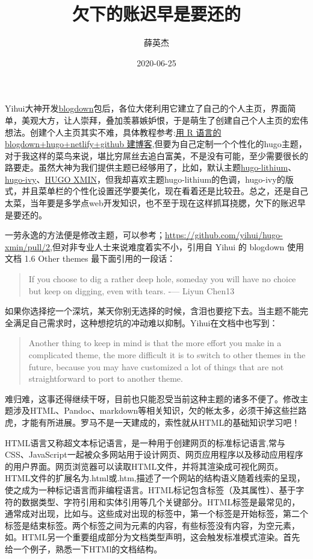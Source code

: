 \documentclass[
]{article}
\title{欠下的账迟早是要还的}
\author{薛英杰}
\date{2020-06-25}
\begin{document}
\maketitle

Yihui大神开发\href{https://bookdown.org/yihui/blogdown/}{blogdown}包后，各位大佬利用它建立了自己的个人主页，界面简单，美观大方，让人崇拜，叠加羡慕嫉妒恨，于是萌生了创建自己个人主页的宏伟想法。创建个人主页其实不难，具体教程参考:\href{https://cosx.org/2018/01/build-blog-with-blogdown-hugo-netlify-github/}{用
R 语言的 blogdown+hugo+netlify+github
建博客},但要为自己定制一个个性化的hugo主题，对于我这样的菜鸟来说，堪比穷屌丝去追白富美，不是没有可能，至少需要很长的路要走。虽然大神为我们提供主题已经够用了，比如，默认主题\href{https://github.com/yihui/hugo-lithium}{hugo-lithium}、\href{https://github.com/yihui/hugo-ivy}{hugo-ivy}、\href{https://deploy-preview-16--hugo-xmin.netlify.app}{HUGO
XMIN}，但我却喜欢主题hugo-lithium的色调，hugo-ivy的版式，并且菜单栏的个性化设置还学要美化，现在看着还是比较丑。总之，还是自己太菜，当年要是多学点web开发知识，也不至于现在这样抓耳挠腮，欠下的账迟早是要还的。

一劳永逸的方法便是修改主题，可以参考；\url{https://github.com/yihui/hugo-xmin/pull/2},但对非专业人士来说难度着实不小，引用自
Yihui 的 blogdown 使用文档 1.6 Other themes 最下面引用的一段话：

\begin{quote}
If you choose to dig a rather deep hole, someday you will have no choice
but keep on digging, even with tears. -\/--- Liyun Chen13
\end{quote}

如果你选择挖一个深坑，某天你别无选择的时候，含泪也要挖下去。当主题不能完全满足自己需求时，这种想挖坑的冲动难以抑制。Yihui在文档中也写到：

\begin{quote}
Another thing to keep in mind is that the more effort you make in a
complicated theme, the more difficult it is to switch to other themes in
the future, because you may have customized a lot of things that are not
straightforward to port to another theme.
\end{quote}

难归难，这事还得继续干呀，目前也只能忍受当前这种主题的诸多不便了。修改主题涉及HTML、Pandoc、markdown等相关知识，欠的帐太多，必须干掉这些拦路虎，才能有所进展。罗马不是一天建成的，索性就从HTML的基础知识学习吧！

HTML语言又称超文本标记语言，是一种用于创建网页的标准标记语言,常与CSS、JavaScript一起被众多网站用于设计网页、网页应用程序以及移动应用程序的用户界面。网页浏览器可以读取HTML文件，并将其渲染成可视化网页。HTML文件的扩展名为.html或.htm,描述了一个网站的结构语义随着线索的呈现，使之成为一种标记语言而非编程语言。HTML标记包含标签（及其属性）、基于字符的数据类型、字符引用和实体引用等几个关键部分。HTML标签是最常见的，通常成对出现，比如与。这些成对出现的标签中，第一个标签是开始标签，第二个标签是结束标签。两个标签之间为元素的内容，有些标签没有内容，为空元素，如。HTML另一个重要组成部分为文档类型声明，这会触发标准模式渲染。首先给一个例子，熟悉一下HTMl的文档结构。
\end{document}
